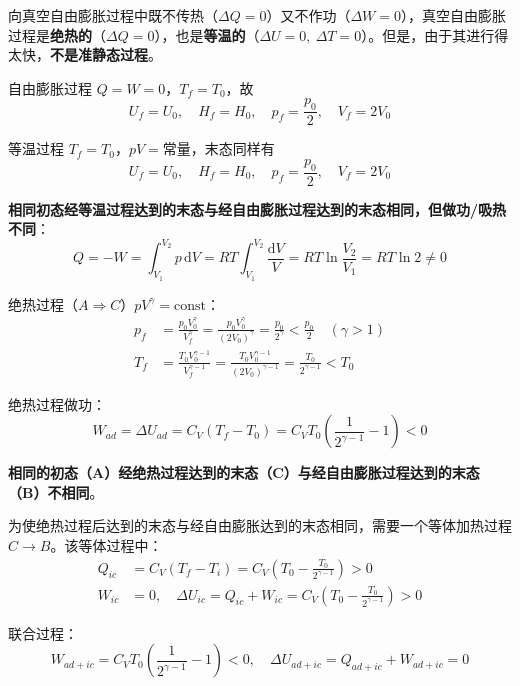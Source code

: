 \documentclass[UTF8]{ctexart}
\theoremstyle{definition}
\begin{document}
向真空自由膨胀过程中既不传热（$\Delta Q=0$）又不作功（$\Delta W=0$），真空自由膨胀过程是\textbf{绝热的}（$\Delta Q=0$），也是\textbf{等温的}（$\Delta U=0,\ \Delta T=0$）。但是，由于其进行得太快，\textbf{不是准静态过程}。

自由膨胀过程 $Q=W=0$，$T_f=T_0$，故
\begin{equation}
U_f=U_0,\quad H_f=H_0,\quad p_f=\frac{p_0}{2},\quad V_f=2V_0
\end{equation}

等温过程 $T_f=T_0$，$pV=\text{常量}$，末态同样有
\begin{equation}
U_f=U_0,\quad H_f=H_0,\quad p_f=\frac{p_0}{2},\quad V_f=2V_0
\end{equation}

\textbf{相同初态经等温过程达到的末态与经自由膨胀过程达到的末态相同，但做功/吸热不同}：
\begin{equation}
Q = -W = \int_{V_1}^{V_2}p\,\mathrm{d}V = RT\int_{V_1}^{V_2}\frac{\mathrm{d}V}{V} = RT\ln\frac{V_2}{V_1} = RT\ln 2 \neq 0
\end{equation}

绝热过程（$A\Rightarrow C$）$pV^\gamma=\text{const}$：
\begin{align}
p_f &= \frac{p_0V_0^\gamma}{V_f^\gamma} = \frac{p_0V_0^\gamma}{(2V_0)^\gamma} = \frac{p_0}{2^\gamma} < \frac{p_0}{2}\quad (\gamma>1) \\
T_f &= \frac{T_0V_0^{\gamma-1}}{V_f^{\gamma-1}} = \frac{T_0V_0^{\gamma-1}}{(2V_0)^{\gamma-1}} = \frac{T_0}{2^{\gamma-1}} < T_0
\end{align}

绝热过程做功：
\begin{equation}
W_{ad} = \Delta U_{ad} = C_V(T_f-T_0) = C_VT_0\left(\frac{1}{2^{\gamma-1}}-1\right) < 0
\end{equation}

\textbf{相同的初态（A）经绝热过程达到的末态（C）与经自由膨胀过程达到的末态（B）不相同}。

为使绝热过程后达到的末态与经自由膨胀达到的末态相同，需要一个等体加热过程 $C\to B$。该等体过程中：
\begin{align}
Q_{ic} &= C_V(T_f-T_i) = C_V\left(T_0-\frac{T_0}{2^{\gamma-1}}\right) > 0 \\
W_{ic} &= 0,\quad \Delta U_{ic} = Q_{ic}+W_{ic} = C_V\left(T_0-\frac{T_0}{2^{\gamma-1}}\right) > 0
\end{align}

联合过程：
\begin{equation}
W_{ad+ic} = C_VT_0\left(\frac{1}{2^{\gamma-1}}-1\right) < 0,\quad \Delta U_{ad+ic} = Q_{ad+ic}+W_{ad+ic} = 0
\end{equation}
\end{document}
